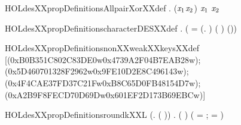 \newcommand{\HOLdesXXpropDate}{23 Ottobre 2024}
\newcommand{\HOLdesXXpropTime}{10:16}
\begin{SaveVerbatim}{HOLdesXXpropDefinitionsAllpairXorXXdef}
\HOLTokenTurnstile{} \HOLSymConst{\HOLTokenForall{}}.   \HOLSymConst{=} \HOLTokenLeftbrace{}(\ensuremath{\HOLBoundVar{x}\sb{\mathrm{1}}}\HOLSymConst{,}\ensuremath{\HOLBoundVar{x}\sb{\mathrm{2}}}) \HOLTokenBar{} \ensuremath{\HOLBoundVar{x}\sb{\mathrm{1}}} \HOLSymConst{\HOLTokenEor{}} \ensuremath{\HOLBoundVar{x}\sb{\mathrm{2}}} \HOLSymConst{=} \HOLTokenRightbrace{}
\end{SaveVerbatim}
\newcommand{\HOLdesXXpropDefinitionsAllpairXorXXdef}{\UseVerbatim{HOLdesXXpropDefinitionsAllpairXorXXdef}}
\begin{SaveVerbatim}{HOLdesXXpropDefinitionscharacterDESXXdef}
\HOLTokenTurnstile{} \HOLSymConst{\HOLTokenForall{}}  .
         \HOLSymConst{=}
     (
         =  (\HOLTokenLambda{}.    ) ( )
        (\HOLSymConst{,}\HOLSymConst{,}))
\end{SaveVerbatim}
\newcommand{\HOLdesXXpropDefinitionscharacterDESXXdef}{\UseVerbatim{HOLdesXXpropDefinitionscharacterDESXXdef}}
\begin{SaveVerbatim}{HOLdesXXpropDefinitionsnonXXweakXXkeysXXdef}
\HOLTokenTurnstile{}  \HOLSymConst{=}
   [(0xB0B351C802C83DE0w\HOLSymConst{,}0x4739A2F04B7EAB28w);
    (0x5D460701328F2962w\HOLSymConst{,}0x9FE10D2E8C496143w);
    (0x4F4CAE37FD37C21Fw\HOLSymConst{,}0xB8C65D0FB48154D7w);
    (0xA2B9F8FECD70D69Dw\HOLSymConst{,}0x601EF2D173B69EBCw)]
\end{SaveVerbatim}
\newcommand{\HOLdesXXpropDefinitionsnonXXweakXXkeysXXdef}{\UseVerbatim{HOLdesXXpropDefinitionsnonXXweakXXkeysXXdef}}
\begin{SaveVerbatim}{HOLdesXXpropDefinitionsroundkXXL}
\HOLTokenTurnstile{} (\HOLSymConst{\HOLTokenForall{}}.    \HOLSymConst{=}  ( )) \HOLSymConst{\HOLTokenConj{}}
   \HOLSymConst{\HOLTokenForall{}} .
      ( )  \HOLSymConst{=}
     (  =   ;  =      \HOLSymConst{\HOLTokenRol{}} )
\end{SaveVerbatim}
